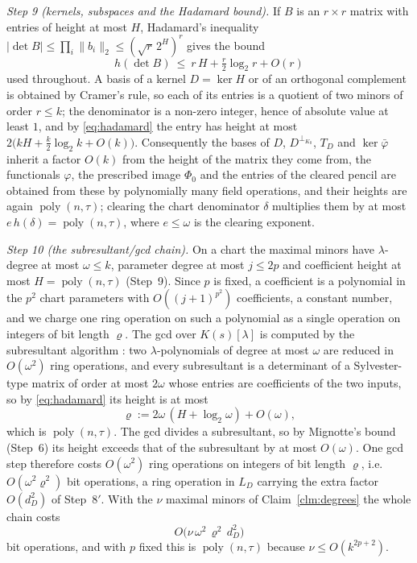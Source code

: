 \documentclass[journal]{IEEEtran}
\theoremstyle{plainn}
\theoremstyle{remark}
\newcommand{\poly}{\operatorname{poly}}
\begin{document}
\emph{Step 9 (kernels, subspaces and the Hadamard bound).} If $B$ is an $r\times r$ matrix with entries of
height at most $H$, Hadamard's inequality $|\det B|\le\prod_i\|b_i\|_2\le(\sqrt r\,2^{H})^{r}$ gives the
bound
\begin{equation}\label{eq:hadamard}
h(\det B)\ \le\ r\,H+\tfrac{r}{2}\log_2 r+O(r)
\end{equation}
used throughout. A basis of a kernel $D=\ker H$ or of an orthogonal complement is obtained by Cramer's
rule, so each of its entries is a quotient of two minors of order $r\le k$; the denominator is a non-zero
integer, hence of absolute value at least $1$, and by \eqref{eq:hadamard} the entry has height at most
$2\bigl(kH+\tfrac{k}{2}\log_2 k+O(k)\bigr)$. Consequently the bases of $D$, $D^{\perp_{K_0}}$, $T_D$ and
$\ker\bar\varphi$ inherit a factor $O(k)$ from the height of the matrix they come from, the functionals
$\varphi$, the prescribed image $\Phi_0$ and the entries of the cleared pencil are obtained from these by
polynomially many field operations, and their heights are again $\poly(n,\tau)$; clearing the chart
denominator $\delta$ multiplies them by at most $e\,h(\delta)=\poly(n,\tau)$, where $e\le\omega$ is the
clearing exponent.

\emph{Step 10 (the subresultant/gcd chain).} On a chart the maximal minors have $\lambda$-degree at most
$\omega\le k$, parameter degree at most $j\le2p$ and coefficient height at most $H=\poly(n,\tau)$
(Step~9). Since $p$ is fixed, a coefficient is a polynomial in the $p^2$ chart parameters with
$O((j+1)^{p^2})$ coefficients, a constant number, and we charge one ring operation on such a polynomial as
a single operation on integers of bit length $\varrho$. The gcd over $K(s)[\lambda]$ is computed by the
subresultant algorithm \cite{vzgg13}: two $\lambda$-polynomials of degree at most $\omega$ are reduced in
$O(\omega^2)$ ring operations, and every subresultant is a determinant of a Sylvester-type matrix of order
at most $2\omega$ whose entries are coefficients of the two inputs, so by \eqref{eq:hadamard} its height is
at most
\[
\varrho:=2\omega\,(H+\log_2\omega)+O(\omega),
\]
which is $\poly(n,\tau)$. The gcd divides a subresultant, so by Mignotte's bound (Step~6) its height exceeds that of the
subresultant by at most $O(\omega)$.
One gcd step therefore costs $O(\omega^2)$ ring operations on integers of bit length $\varrho$, i.e.\
$O(\omega^2\varrho^2)$ bit operations, a ring operation in $L_D$ carrying the extra factor $O(d_D^2)$ of
Step~$8'$. With the $\nu$ maximal minors of Claim~\ref{clm:degrees} the whole chain costs
\[
O\bigl(\nu\,\omega^2\,\varrho^2\,d_D^2\bigr)
\]
bit operations, and with $p$ fixed this is $\poly(n,\tau)$ because $\nu\le O(k^{2p+2})$.
\end{document}
